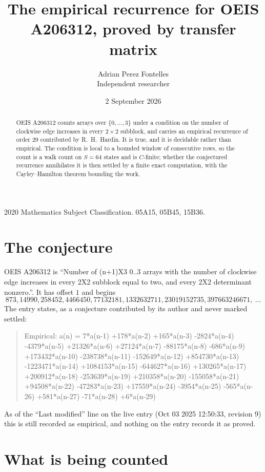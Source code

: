 \documentclass[11pt,a4paper]{article}
\title{The empirical recurrence for OEIS A206312, proved by transfer matrix}
\author{Adrian Perez Fontelles\\ \small Independent researcher}
\date{2 September 2026}
\theoremstyle{plain}
\theoremstyle{definition}
\begin{document}
\maketitle

\begin{abstract}
OEIS A206312 counts arrays over $\{0,\dots,3\}$ under a condition on the number of clockwise edge increases
in every $2\times2$ subblock, and carries an empirical recurrence of order $29$ contributed by
R.~H.~Hardin. It is true, and it is decidable rather than empirical. The condition is local to
a bounded window of consecutive rows, so the count is a walk count on $S=64$ states and is
$C$-finite; whether the conjectured recurrence annihilates it is then settled by a finite exact
computation, with the Cayley--Hamilton theorem bounding the work.
\end{abstract}

\noindent\small 2020 Mathematics Subject Classification. 05A15, 05B45, 15B36.\normalsize

\section{The conjecture}

OEIS A206312 is ``Number of (n+1)X3 0..3 arrays with the number of clockwise edge increases in every 2X2 subblock equal to two, and every 2X2 determinant nonzero.''. It has offset $1$ and begins
\[
873, 14990, 258452, 4466450, 77132181, 1332632711, 23019152735, 397663246671,\ \dots
\]
The entry states, as a conjecture contributed by its author and never marked settled:
\begin{quote}
Empirical: a(n) = 7*a(n-1) +178*a(n-2) +165*a(n-3) -2824*a(n-4) -4379*a(n-5) +21326*a(n-6) +27124*a(n-7) -88175*a(n-8) -686*a(n-9) +173432*a(n-10) -238738*a(n-11) -152649*a(n-12) +854730*a(n-13) -1223471*a(n-14) +1084153*a(n-15) -644627*a(n-16) +130265*a(n-17) +200912*a(n-18) -253639*a(n-19) +210358*a(n-20) -155058*a(n-21) +94508*a(n-22) -47283*a(n-23) +17559*a(n-24) -3954*a(n-25) -565*a(n-26) +581*a(n-27) -71*a(n-28) +6*a(n-29)
\end{quote}
As of the ``Last modified'' line on the live entry (Oct 03 2025 12:50:33, revision 9) this is still
recorded as empirical, and nothing on the entry records it as proved.

\section{What is being counted}
\end{document}
